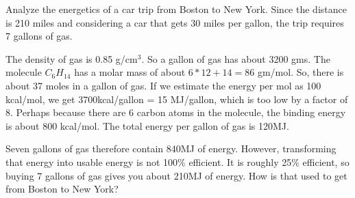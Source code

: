 \documentclass[11pt]{book}
\begin{document}

Analyze the energetics of a car trip from Boston to New York. Since the distance is 210 miles and considering a car that gets 30 miles per gallon, the trip requires 7 gallons of gas. 


The density of gas is  0.85 g/cm$^3$. So a gallon of gas has about 3200 gms. The molecule $C_6H_{14}$ has a molar mass of about $6*12+14=86$ gm/mol. So, there is about 37 moles in a gallon of gas. If we estimate the energy per mol as 100 kcal/mol, we get 3700kcal/gallon = 15 MJ/gallon, which is too low by a factor of 8. Perhaps because there are 6 carbon atoms in the molecule, the binding energy is about 800 kcal/mol. The total energy per gallon of gas is 120MJ.

Seven gallons of gas therefore contain 840MJ of energy. However, transforming that energy into usable energy is not 100\% efficient. It is roughly 25\% efficient, so buying 7 gallons of gas gives you about 210MJ of energy. How is that used to get from Boston to New York?
\end{document}
